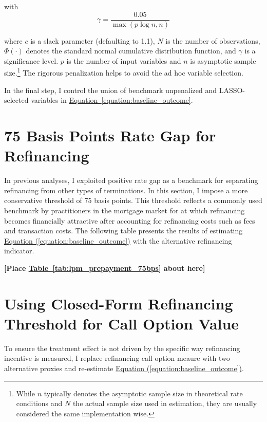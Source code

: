 \documentclass[11pt]{article}
\begin{document}
{with 
\[
\gamma = \frac{0.05}{\max(p \log n, n)}
\]

where $c$ is a slack parameter (defaulting to 1.1), $N$ is the number of observations, $\Phi(\cdot)$ denotes the standard normal cumulative distribution function, and $\gamma$ is a significance level. $p$ is the number of input variables and $n$ is asymptotic sample size.\footnote{While \(n\) typically denotes the asymptotic sample size in theoretical rate conditions and \(N\) the actual sample size used in estimation, they are usually considered the same implementation wise.} The rigorous penalization helps to avoid the ad hoc variable selection. 


In the final step, I control the union of benchmark unpenalized and LASSO-selected variables in \hyperref[equation:baseline_outcome]{Equation~\ref{equation:baseline_outcome}}.


\section{75 Basis Points Rate Gap for Refinancing}
 \label{sec:75bps}
 
In previous analyses, I exploited positive rate gap as a benchmark for separating refinancing from other types of terminations.  In this section, I impose a more conservative threshold of 75 basis points. This threshold reflects a commonly used benchmark by practitioners in the mortgage market for at which refinancing becomes financially attractive after accounting for refinancing costs such as fees and transaction costs. The following table presents the results of estimating  \hyperref[baseline_outcome]{Equation (\ref*{equation:baseline_outcome})} with the alternative refinancing indicator. 

\bigskip
\centerline{\bf [Place \hyperref[tab:immortal]{Table~\ref*{tab:lpm_prepayment_75bps}} about here]}
\bigskip


\section{Using Closed-Form Refinancing Threshold for Call Option Value}

\label{appendix:ADL}

To ensure the treatment effect is not driven by the specific way refinancing incentive is measured, I replace \citet{deng2000mortgage} refinancing call option meaure with two alternative proxies and re-estimate \hyperref[equation:baseline_outcome]{Equation (\ref*{equation:baseline_outcome})}.

}
\end{document}
